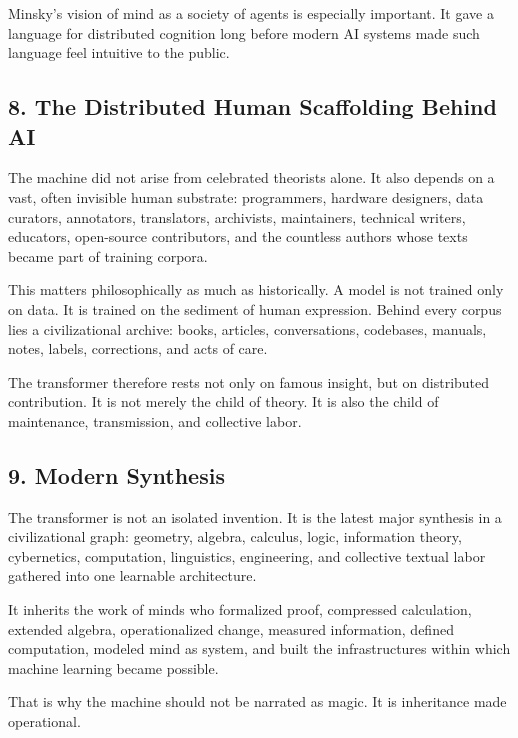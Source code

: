 \documentclass[
]{article}
\begin{document}
Minsky's vision of mind as a society of agents is especially important.
It gave a language for distributed cognition long before modern AI
systems made such language feel intuitive to the public.

\hypertarget{the-distributed-human-scaffolding-behind-ai}{%
\subsection{8. The Distributed Human Scaffolding Behind
AI}\label{the-distributed-human-scaffolding-behind-ai}}

The machine did not arise from celebrated theorists alone. It also
depends on a vast, often invisible human substrate: programmers,
hardware designers, data curators, annotators, translators, archivists,
maintainers, technical writers, educators, open-source contributors, and
the countless authors whose texts became part of training corpora.

This matters philosophically as much as historically. A model is not
trained only on data. It is trained on the sediment of human expression.
Behind every corpus lies a civilizational archive: books, articles,
conversations, codebases, manuals, notes, labels, corrections, and acts
of care.

The transformer therefore rests not only on famous insight, but on
distributed contribution. It is not merely the child of theory. It is
also the child of maintenance, transmission, and collective labor.

\hypertarget{modern-synthesis}{%
\subsection{9. Modern Synthesis}\label{modern-synthesis}}

The transformer is not an isolated invention. It is the latest major
synthesis in a civilizational graph: geometry, algebra, calculus, logic,
information theory, cybernetics, computation, linguistics, engineering,
and collective textual labor gathered into one learnable architecture.

It inherits the work of minds who formalized proof, compressed
calculation, extended algebra, operationalized change, measured
information, defined computation, modeled mind as system, and built the
infrastructures within which machine learning became possible.

That is why the machine should not be narrated as magic. It is
inheritance made operational.
\end{document}
